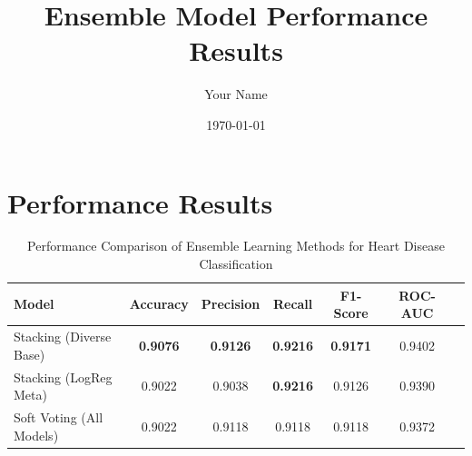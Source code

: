 \documentclass[12pt,a4paper]{article}
\title{Ensemble Model Performance Results}
\author{Your Name}
\date{\today}
\begin{document}
\maketitle

\section{Performance Results}

\begin{table}[H]
\centering
\caption{Performance Comparison of Ensemble Learning Methods for Heart Disease Classification}
\label{tab:ensemble_results}
\begin{tabular}{lcccccc}
\hline
\textbf{Model} & \textbf{Accuracy} & \textbf{Precision} & \textbf{Recall} & \textbf{F1-Score} & \textbf{ROC-AUC} \\
\hline
Stacking (Diverse Base) & \textbf{0.9076} & \textbf{0.9126} & \textbf{0.9216} & \textbf{0.9171} & 0.9402 \\
Stacking (LogReg Meta) & 0.9022 & 0.9038 & \textbf{0.9216} & 0.9126 & 0.9390 \\
Soft Voting (All Models) & 0.9022 & 0.9118 & 0.9118 & 0.9118 & 0.9372 \\
\hline
\end{tabular}
\end{table}
\end{document}
